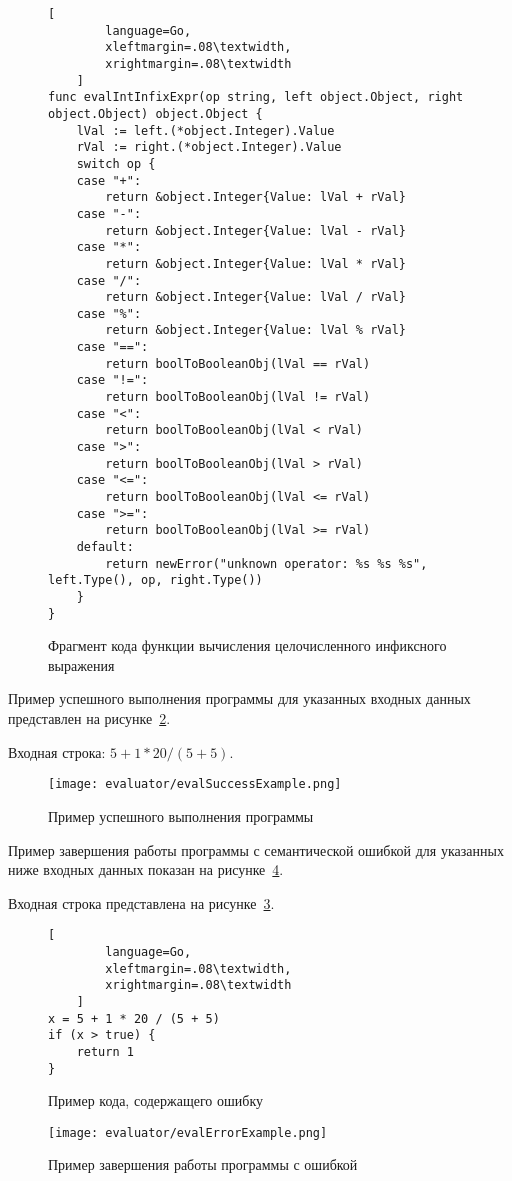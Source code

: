 \begin{figure}[!htb]
	\centering
	\begin{lstlisting}[
        language=Go,
        xleftmargin=.08\textwidth,
        xrightmargin=.08\textwidth
    ]
func evalIntInfixExpr(op string, left object.Object, right object.Object) object.Object {
    lVal := left.(*object.Integer).Value
    rVal := right.(*object.Integer).Value
    switch op {
    case "+":
        return &object.Integer{Value: lVal + rVal}
    case "-":
        return &object.Integer{Value: lVal - rVal}
    case "*":
        return &object.Integer{Value: lVal * rVal}
    case "/":
        return &object.Integer{Value: lVal / rVal}
    case "%":
        return &object.Integer{Value: lVal % rVal}
    case "==":
        return boolToBooleanObj(lVal == rVal)
    case "!=":
        return boolToBooleanObj(lVal != rVal)
    case "<":
        return boolToBooleanObj(lVal < rVal)
    case ">":
        return boolToBooleanObj(lVal > rVal)
    case "<=":
        return boolToBooleanObj(lVal <= rVal)
    case ">=":
        return boolToBooleanObj(lVal >= rVal)
    default:
        return newError("unknown operator: %s %s %s", left.Type(), op, right.Type())
    }
}
\end{lstlisting}
	\caption{Фрагмент кода функции вычисления целочисленного инфиксного выражения}
	\label{f:code_evalIntInfixExpr}
\end{figure}


Пример успешного выполнения программы для указанных входных данных представлен на рисунке~\ref{f:evalSuccessExample}.

Входная строка: $5 + 1 * 20 / (5 + 5)$.

\clearpage

\begin{figure}[!htb]
	\centering
	\texttt{[image: evaluator/evalSuccessExample.png]}
	\caption{Пример успешного выполнения программы}
	\label{f:evalSuccessExample}
\end{figure}

Пример завершения работы программы с семантической ошибкой для указанных ниже входных данных показан на рисунке~\ref{f:evalErrorExample}.

Входная строка представлена на рисунке~\ref{f:code_evalErrorExample}.

\begin{figure}[!htb]
	\centering
    \vspace{\toppaddingoffigure}
	\begin{lstlisting}[
        language=Go,
        xleftmargin=.08\textwidth,
        xrightmargin=.08\textwidth
    ]
x = 5 + 1 * 20 / (5 + 5)
if (x > true) {
    return 1
}    
\end{lstlisting}
	\caption{Пример кода, содержащего ошибку}
	\label{f:code_evalErrorExample}
\end{figure}

\begin{figure}[!htb]
	\centering
	\texttt{[image: evaluator/evalErrorExample.png]}
	\caption{Пример завершения работы программы с ошибкой}
	\label{f:evalErrorExample}
\end{figure}